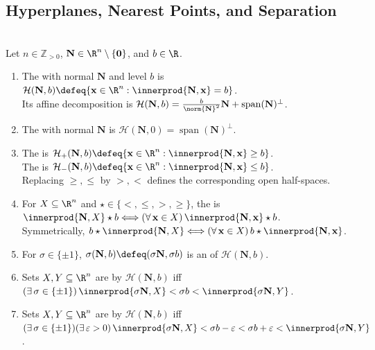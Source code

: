 \subsection{Hyperplanes, Nearest Points, and Separation}

\begin{definition} \label{def:affine-hyperplanes-halfspaces-separation} \\
Let $n\in\mathbb{Z}_{>0}$, $\mathbf{N}\in\R^n\setminus\{\mathbf{0}\}$, and $b\in\R$.
\begin{enumerate}[label=(\roman*)]
\setlength{\itemsep}{0pt}
\item The  with normal $\mathbf{N}$ and level $b$ is $\mathcal{H}(\mathbf{N},b)\defeq\{\mathbf{x}\in\R^n:\innerprod{\mathbf{N},\mathbf{x}}=b\}$.\\
Its affine decomposition is $\mathcal{H}(\mathbf{N},b)=\frac{b}{\norm{\mathbf{N}}^2}\mathbf{N}+\operatorname{span}(\mathbf{N})^\perp$.
\item The  with normal $\mathbf{N}$ is $\mathcal{H}(\mathbf{N},0)=\operatorname{span}(\mathbf{N})^\perp$.
\item The  is $\mathcal{H}_+(\mathbf{N},b)\defeq\{\mathbf{x}\in\R^n:\innerprod{\mathbf{N},\mathbf{x}}\geq b\}$.\\
The  is $\mathcal{H}_-(\mathbf{N},b)\defeq\{\mathbf{x}\in\R^n:\innerprod{\mathbf{N},\mathbf{x}}\leq b\}$.\\
Replacing $\geq,\leq$ by $>,<$ defines the corresponding open half-spaces.
\item For $X\subseteq\R^n$ and $\star\in\{<,\leq,>,\geq\}$, the  is $\innerprod{\mathbf{N},X}\star b\Longleftrightarrow(\forall\,\mathbf{x}\in X)\,\innerprod{\mathbf{N},\mathbf{x}}\star b$.\\
Symmetrically, $b\star\innerprod{\mathbf{N},X}\Longleftrightarrow(\forall\,\mathbf{x}\in X)\,b\star\innerprod{\mathbf{N},\mathbf{x}}$.
\item For $\sigma\in\{\pm1\}$, $\sigma(\mathbf{N},b)\defeq(\sigma\mathbf{N},\sigma b)$ is an  of $\mathcal{H}(\mathbf{N},b)$.
\item Sets $X,Y\subseteq\R^n$ are  by $\mathcal{H}(\mathbf{N},b)$ iff $(\exists\,\sigma\in\{\pm1\})\,\innerprod{\sigma\mathbf{N},X}<\sigma b<\innerprod{\sigma\mathbf{N},Y}$.
\item Sets $X,Y\subseteq\R^n$ are  by $\mathcal{H}(\mathbf{N},b)$ iff $(\exists\,\sigma\in\{\pm1\})(\exists\,\varepsilon>0)\,\innerprod{\sigma\mathbf{N},X}<\sigma b-\varepsilon<\sigma b+\varepsilon<\innerprod{\sigma\mathbf{N},Y}$.
\end{enumerate}
\end{definition}

